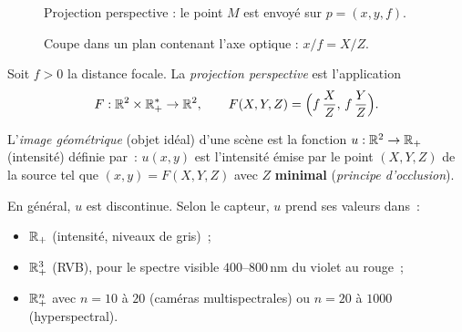 \begin{figure}[!htb]\centering
  
  \caption{Projection perspective : le point $M$ est envoyé sur $p=(x,y,f)$.}\label{fig:persp-3d}
\end{figure}

\begin{figure}[!htb]\centering
  

  \caption{Coupe dans un plan contenant l'axe optique : $x/f=X/Z$.}\label{fig:persp-coupe}
\end{figure}

\begin{definition}\label{def:persp}
  Soit $f>0$ la distance focale. La \emph{projection perspective} est l'application
  \[
    F:\mathbb{R}^2\times\mathbb{R}_+^{*}\to\mathbb{R}^2,\qquad F(X,Y,Z)=\Bigl(f\,\frac{X}{Z},\,f\,\frac{Y}{Z}\Bigr).
  \]
\end{definition}


\begin{definition}\label{def:imgeo}
  L'\emph{image géométrique} (objet idéal) d'une scène est la fonction $u:\mathbb{R}^2\to\mathbb{R}_+$ (intensité) définie par~: $u(x,y)$ est l'intensité émise par le point $(X,Y,Z)$ de la source tel que $(x,y)=F(X,Y,Z)$ avec $Z$ \textbf{minimal} (\emph{principe d'occlusion}).
\end{definition}

En général, $u$ est discontinue. Selon le capteur, $u$ prend ses valeurs dans~:
\begin{itemize}
  \item $\mathbb{R}_+$ (intensité, niveaux de gris)~;
  \item $\mathbb{R}_+^3$ (RVB), pour le spectre visible $400$--$800$\,nm du violet au rouge~;
  \item $\mathbb{R}_+^n$ avec $n=10$ à $20$ (caméras multispectrales) ou $n=20$ à $1000$ (hyperspectral).
\end{itemize}

